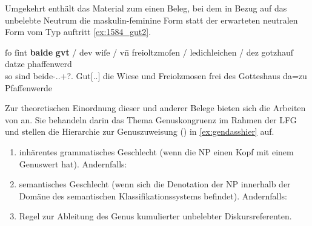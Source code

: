 Umgekehrt enthält das Material zum  einen Beleg, bei dem in
Bezug auf das un\-belebte Neutrum   die maskulin-feminine
Form  statt der erwarteten neutralen Form vom Typ 
auftritt \cref{ex:1584_gut2}.

\begin{exe}
\ex\label{ex:1584_gut2}
	\gll ſo ſint \textbf{baide} \textbf{gvt} / dev wiſe / vn̄ freioltzmoſen /
			ledichleichen / dez gotzhauſ datze phaffenwerd \\
		so sind beide-\Nom.\Pl.\M+\F?\subI.\St{} Gut[\Nom.\Pl.\NeutI] {} die
			Wiese {} und Freiolzmosen {} frei {} des Gotteshaus da=zu
			Pfaffenwerde \\
	\begin{taggedline}{\parencites(Kl.~Herrenchiemsee, Kr.~Rosenheim, 1292)[\pno~1584, 727.26--27]{cao2}}
		\trans {}
	\end{taggedline}
\end{exe}


Zur theoretischen Einordnung dieser und anderer Belege bieten sich die Arbeiten
von \textcites[171--195]{wechslerzlatic2003}{wechsler2009} an. Sie behandeln
darin das Thema Genus\-kongruenz im Rahmen der LFG \autocites(vgl.~%
\cref{sec:lfgkongr}){bresnanetal2016} und stellen die Hierarchie zur
Genuszuweisung () in \cref{ex:gendasshier} auf.

\begin{exe}
\ex\label{ex:gendasshier}
	\begin{taggedline}{\parencites[nach][584]{wechsler2009}[vgl.][195]{wechslerzlatic2003}}
		\begin{enumerate}[noitemsep]
			\item inhärentes grammatisches Geschlecht (wenn die NP einen Kopf
				mit einem Genuswert hat). Andernfalls:
			\item semantisches Geschlecht (wenn sich die Denotation der NP
				innerhalb der Domäne des semantischen Klassifikationssystems
				befindet). Andernfalls:
			\item Regel zur Ableitung des Genus kumulierter unbelebter 
				Diskursreferenten.
		\end{enumerate}
	\end{taggedline}
\end{exe}

